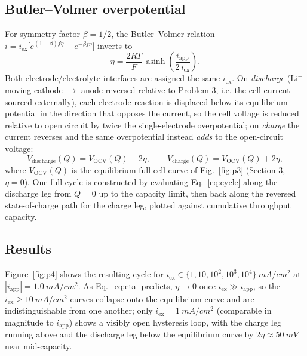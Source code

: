 \documentclass[11pt]{article}
\begin{document}
\subsection{Butler--Volmer overpotential}
For symmetry factor $\beta = 1/2$, the Butler--Volmer relation $i = i_{\mathrm{ex}}\big[e^{(1-\beta)f\eta} - e^{-\beta f\eta}\big]$
inverts to
\begin{equation}
\eta = \frac{2RT}{F}\,\operatorname{asinh}\!\left(\frac{i_{\mathrm{app}}}{2\,i_{\mathrm{ex}}}\right).
\label{eq:eta}
\end{equation}
Both electrode/electrolyte interfaces are assigned the same $i_{\mathrm{ex}}$. On \emph{discharge}
($\mathrm{Li^+}$ moving cathode $\to$ anode reversed relative to Problem 3, i.e. the cell current sourced externally),
each electrode reaction is displaced below its equilibrium potential in the direction that opposes the current, so
the cell voltage is reduced relative to open circuit by twice the single-electrode overpotential; on \emph{charge}
the current reverses and the same overpotential instead \emph{adds} to the open-circuit voltage:
\begin{equation}
V_{\mathrm{discharge}}(Q) = V_{\mathrm{OCV}}(Q) - 2\eta, \qquad
V_{\mathrm{charge}}(Q) = V_{\mathrm{OCV}}(Q) + 2\eta,
\label{eq:cycle}
\end{equation}
where $V_{\mathrm{OCV}}(Q)$ is the equilibrium full-cell curve of Fig.~\ref{fig:p3} (Section 3, $\eta=0$). One full
cycle is constructed by evaluating Eq.~\eqref{eq:cycle} along the discharge leg from $Q=0$ up to the capacity limit,
then back along the reversed state-of-charge path for the charge leg, plotted against cumulative throughput capacity.

\subsection{Results}
Figure~\ref{fig:p4} shows the resulting cycle for $i_{\mathrm{ex}} \in \{1, 10, 10^2, 10^3, 10^4\}~\si{mA/cm^2}$ at
$|i_{\mathrm{app}}| = 1.0~\si{mA/cm^2}$. As Eq.~\eqref{eq:eta} predicts, $\eta \to 0$ once $i_{\mathrm{ex}} \gg
i_{\mathrm{app}}$, so the $i_{\mathrm{ex}}\ge 10~\si{mA/cm^2}$ curves collapse onto the equilibrium curve and are
indistinguishable from one another; only $i_{\mathrm{ex}} = 1~\si{mA/cm^2}$ (comparable in magnitude to
$i_{\mathrm{app}}$) shows a visibly open hysteresis loop, with the charge leg running above and the discharge leg
below the equilibrium curve by $2\eta \approx \SI{50}{mV}$ near mid-capacity.
\end{document}
